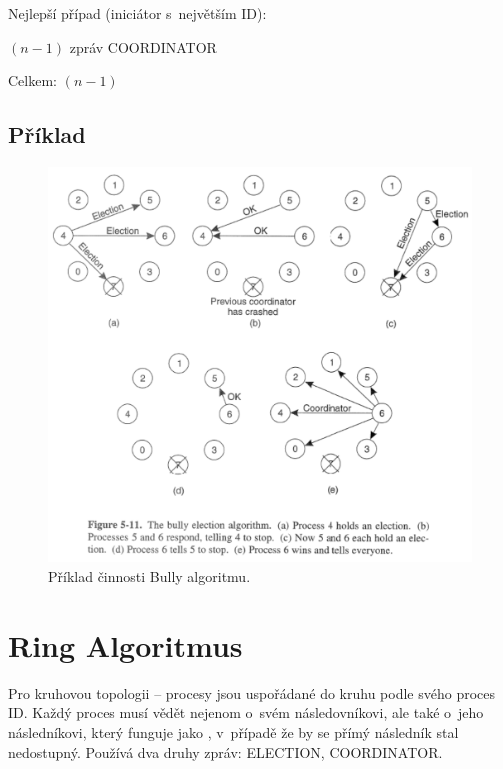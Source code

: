\noindent Nejlepší případ (iniciátor s~největším ID):

\begin{compactitem}
    \item $(n-1)$ zpráv COORDINATOR
    \item Celkem: $(n-1)$
\end{compactitem}

\subsection{Příklad}

\begin{figure}[H]
    \centering
    \includegraphics[width=1\linewidth]{example_bully.pdf}
    \caption{Příklad činnosti Bully algoritmu.}
\end{figure}


\section{Ring Algoritmus}

Pro kruhovou topologii -- procesy jsou uspořádané do kruhu podle svého proces ID.
Každý proces musí vědět nejenom o~svém následovníkovi, ale také o~jeho následníkovi, který funguje jako , v~případě že by se přímý následník stal nedostupný. Používá dva druhy zpráv: ELECTION, COORDINATOR.

